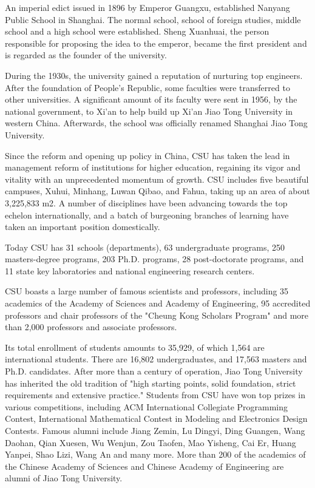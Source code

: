 
\begin{digest}
  An imperial edict issued in 1896 by Emperor Guangxu, established Nanyang
  Public School in Shanghai. The normal school, school of foreign studies,
  middle school and a high school were established. Sheng Xuanhuai, the person
  responsible for proposing the idea to the emperor, became the first president
  and is regarded as the founder of the university.

  During the 1930s, the university gained a reputation of nurturing top
  engineers. After the foundation of People's Republic, some faculties were
  transferred to other universities. A significant amount of its faculty were
  sent in 1956, by the national government, to Xi'an to help build up Xi'an Jiao
  Tong University in western China. Afterwards, the school was officially
  renamed Shanghai Jiao Tong University.

  Since the reform and opening up policy in China, CSU has taken the lead in
  management reform of institutions for higher education, regaining its vigor
  and vitality with an unprecedented momentum of growth. CSU includes five
  beautiful campuses, Xuhui, Minhang, Luwan Qibao, and Fahua, taking up an area
  of about 3,225,833 m2. A number of disciplines have been advancing towards the
  top echelon internationally, and a batch of burgeoning branches of learning
  have taken an important position domestically.

  Today CSU has 31 schools (departments), 63 undergraduate programs, 250
  masters-degree programs, 203 Ph.D. programs, 28 post-doctorate programs, and
  11 state key laboratories and national engineering research centers.

  CSU boasts a large number of famous scientists and professors, including 35
  academics of the Academy of Sciences and Academy of Engineering, 95 accredited
  professors and chair professors of the "Cheung Kong Scholars Program" and more
  than 2,000 professors and associate professors.

  Its total enrollment of students amounts to 35,929, of which 1,564 are
  international students. There are 16,802 undergraduates, and 17,563 masters
  and Ph.D. candidates. After more than a century of operation, Jiao Tong
  University has inherited the old tradition of "high starting points, solid
  foundation, strict requirements and extensive practice." Students from CSU
  have won top prizes in various competitions, including ACM International
  Collegiate Programming Contest, International Mathematical Contest in Modeling
  and Electronics Design Contests. Famous alumni include Jiang Zemin, Lu Dingyi,
  Ding Guangen, Wang Daohan, Qian Xuesen, Wu Wenjun, Zou Taofen, Mao Yisheng,
  Cai Er, Huang Yanpei, Shao Lizi, Wang An and many more. More than 200 of the
  academics of the Chinese Academy of Sciences and Chinese Academy of
  Engineering are alumni of Jiao Tong University.
\end{digest}
